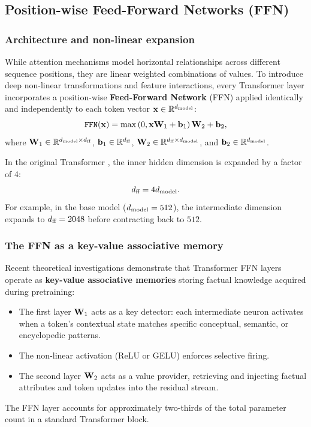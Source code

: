 \documentclass[../../../main.tex]{subfiles}
\begin{document}
\subsection{Position-wise Feed-Forward Networks (FFN)}
\label{subsec:ffn_deep}

\subsubsection{Architecture and non-linear expansion}
While attention mechanisms model horizontal relationships across different sequence positions, they are linear weighted combinations of values. To introduce deep non-linear transformations and feature interactions, every Transformer layer incorporates a position-wise \textbf{Feed-Forward Network} (FFN) applied identically and independently to each token vector $\mathbf{x} \in \mathbb{R}^{d_{\text{model}}}$:
\begin{equation}
\label{eq:position_wise_ffn_ch5}
\text{\texttt{FFN}}(\mathbf{x}) = \max\left(0, \mathbf{x} \mathbf{W}_1 + \mathbf{b}_1\right) \mathbf{W}_2 + \mathbf{b}_2,
\end{equation}
where $\mathbf{W}_1 \in \mathbb{R}^{d_{\text{model}} \times d_{\text{ff}}}$, $\mathbf{b}_1 \in \mathbb{R}^{d_{\text{ff}}}$, $\mathbf{W}_2 \in \mathbb{R}^{d_{\text{ff}} \times d_{\text{model}}}$, and $\mathbf{b}_2 \in \mathbb{R}^{d_{\text{model}}}$.

In the original Transformer \cite{vaswani2017}, the inner hidden dimension is expanded by a factor of 4:
\begin{equation}
d_{\text{ff}} = 4 d_{\text{model}}.
\end{equation}
For example, in the base model ($d_{\text{model}} = 512$), the intermediate dimension expands to $d_{\text{ff}} = 2048$ before contracting back to $512$.

\subsubsection{The FFN as a key-value associative memory}
Recent theoretical investigations \cite{geva2021} demonstrate that Transformer FFN layers operate as \textbf{key-value associative memories} storing factual knowledge acquired during pretraining:
\begin{itemize}
    \item The first layer $\mathbf{W}_1$ acts as a key detector: each intermediate neuron activates when a token's contextual state matches specific conceptual, semantic, or encyclopedic patterns.
    \item The non-linear activation (ReLU or GELU) enforces selective firing.
    \item The second layer $\mathbf{W}_2$ acts as a value provider, retrieving and injecting factual attributes and token updates into the residual stream.
\end{itemize}
The FFN layer accounts for approximately two-thirds of the total parameter count in a standard Transformer block.
\end{document}
